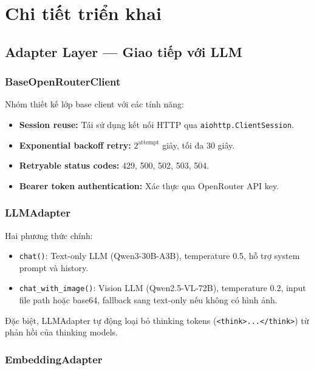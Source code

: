 \documentclass[12pt,a4paper]{article}
\begin{document}
\section{Chi tiết triển khai}

\subsection{Adapter Layer --- Giao tiếp với LLM}

\subsubsection{BaseOpenRouterClient}

Nhóm thiết kế lớp base client với các tính năng:

\begin{itemize}
  \item \textbf{Session reuse:} Tái sử dụng kết nối HTTP qua \texttt{aiohttp.ClientSession}.
  \item \textbf{Exponential backoff retry:} $2^{\text{attempt}}$ giây, tối đa 30 giây.
  \item \textbf{Retryable status codes:} 429, 500, 502, 503, 504.
  \item \textbf{Bearer token authentication:} Xác thực qua OpenRouter API key.
\end{itemize}

\subsubsection{LLMAdapter}

Hai phương thức chính:

\begin{itemize}
  \item \texttt{chat()}: Text-only LLM (Qwen3-30B-A3B), temperature 0.5, hỗ trợ system prompt và history.
  \item \texttt{chat\_with\_image()}: Vision LLM (Qwen2.5-VL-72B), temperature 0.2, input file path hoặc base64, fallback sang text-only nếu không có hình ảnh.
\end{itemize}

Đặc biệt, LLMAdapter tự động loại bỏ thinking tokens (\texttt{<think>...</think>}) từ phản hồi của thinking models.

\subsubsection{EmbeddingAdapter}
\end{document}
